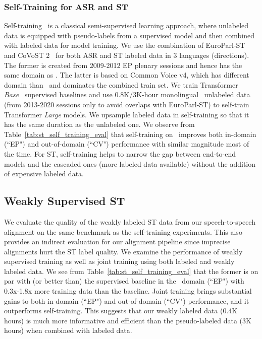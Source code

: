 \subsubsection{Self-Training for ASR and ST}
\label{sec:self_training}
Self-training~\citep{scudder1965probability} is a classical semi-supervised learning approach, where unlabeled data is equipped with pseudo-labels from a supervised model and then combined with labeled data for model training. We use the combination of EuroParl-ST~\citep{iranzo2020europarl} and CoVoST 2~\citep{wang2020covost} for both ASR and ST labeled data in 3 languages (directions). The former is created from 2009-2012 EP plenary sessions and hence has the same domain as \vp. The latter is based on Common Voice v4, which has different domain than \vp~and dominates the combined train set. We train Transformer \emph{Base}~\citep{NIPS2017_3f5ee243} supervised baselines and use 0.8K/3K-hour monolingual \vp~unlabeled data (from 2013-2020 sessions only to avoid overlaps with EuroParl-ST) to self-train Transformer \emph{Large} models. We upsample labeled data in self-training so that it has the same duration as the unlabeled one. We observe from Table~\ref{tab:st_self_training_eval} that self-training on \vp~improves both in-domain (``EP") and out-of-domain (``CV") performance with similar magnitude most of the time. For ST, self-training helps to narrow the gap between end-to-end models and the cascaded ones (more labeled data available) without the addition of expensive labeled data.

\subsection{Weakly Supervised ST}
We evaluate the quality of the weakly labeled ST data from our speech-to-speech alignment on the same benchmark as the self-training experiments. This also provides an indirect evaluation for our alignment pipeline since imprecise alignments hurt the ST label quality. 
We examine the performance of weakly supervised training as well as joint training using both labeled and weakly labeled data. We see from Table~\ref{tab:st_self_training_eval} that the former is on par with (or better than) the supervised baseline in the \vp~domain (``EP") with 0.3x-1.8x more training data than the baseline. Joint training brings substantial gains to both in-domain (``EP") and out-of-domain (``CV") performance, and it outperforms self-training. This suggests that our weakly labeled data (0.4K hours) is much more informative and efficient than the pseudo-labeled data (3K hours) when combined with labeled data.

